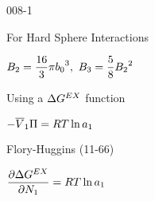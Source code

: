 \begin{mitframe}{008-1}
\begin{listone}
\begin{listtwo}
\begin{listthree}
\begin{listfour}
                \item For Hard Sphere Interactions
				
                \begin{listfive}
					
                    \item $\virialcoeff{2} = \dfrac{16}{3}\pie {b_{\init}}^3,~\virialcoeff{3} = \dfrac{5}{8} {\virialcoeff{2}}^2 $
                    
				\end{listfive}
                
			\end{listfour}
            
			\item Using a $\iipf\gibbs^{\exfunc}$ function
            
			\begin{listfour}
            
				\item $-\overline{\vol}_1\osmpress = \gasconst\Temp\ln\activityi{1}$
                
				\begin{listfive}
                
					\item Flory-Huggins (11-66)
					\item $\dfrac{\partial\iipf\gibbs^{\exfunc}}{\partial\molesi{1}} = \gasconst\Temp\ln\activityi{1}$
                    
				\end{listfive}
                
			\end{listfour}
            
		\end{listthree}
        
	\end{listtwo}
    
\end{listone}

\end{mitframe}